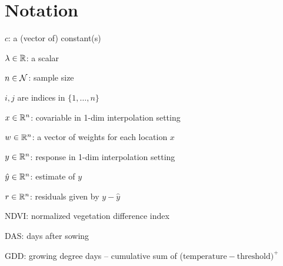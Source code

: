 \chapter*{Notation}
\label{c:Notation}

$c$: a (vector of) constant(s)

$\lambda \in \mathbb{R}$: a scalar

$n\in \operatorname{\mathcal{N}}$: sample size

$i,j$ are indices in $\{1,\dots,n\}$

$x\in \mathbb{R}^n$: covariable in 1-dim interpolation setting

$w \in \mathbb{R}^n$: a vector of weights for each location $x$

$y\in \mathbb{R}^n$: response in 1-dim interpolation setting

$\hat y\in \mathbb{R}^n$: estimate of $y$

$r \in \mathbb{R}^n$: residuals given by $y - \hat y$



NDVI: normalized vegetation difference index

DAS: days after sowing

GDD: growing degree days -- cumulative sum of ($\text{temperature}-\text{threshold})^+$


